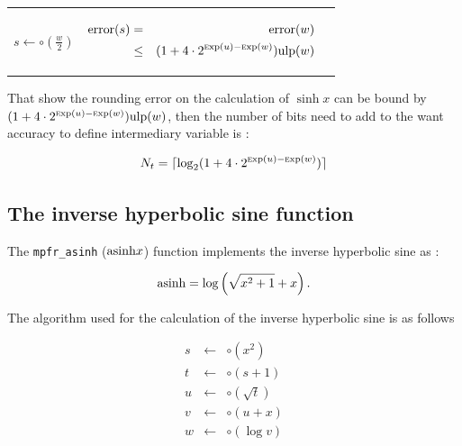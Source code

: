 \documentclass[12pt]{amsart}
\def\n{\textnormal}
\def\ulp{{\rm ulp}}
\def\Exp{{\rm \textsc exp}}
\begin{document}
\begin{center}
\begin{tabular}{l l l}
\begin{minipage}{2.5cm}
$s \leftarrow \circ(\frac{w}{2}) $
\end{minipage} &
\begin{minipage}{7.5cm}

\begin{center}


\begin{eqnarray}\nonumber
 {\textnormal{error}}(s) & = &  {\textnormal{error}}(w)\\\nonumber
 & \leq &  (1+ 4 \cdot 2^{\Exp(u)-\Exp(w)}) \ulp(w)
\end{eqnarray}



\end{center}

\end{minipage} &
\begin{minipage}{6cm}


\end{minipage}


\end{tabular}
\end{center}


That show the rounding error on the calculation of $\sinh x$ can be bound by $(1+ 4 \cdot 2^{\Exp(u)-\Exp(w)}) \ulp(w)$, then the number of bits need to add to the want accuracy to define intermediary variable is :

\[
N_t=\lceil \log_2(1+ 4 \cdot 2^{\Exp(u)-\Exp(w)}) \rceil
\]


\subsection{The inverse hyperbolic sine function}

The {\tt mpfr\_asinh} ($\n{asinh}{x}$) function implements the inverse hyperbolic sine as :

\[\n{asinh} = \log \left( \sqrt{x^2+1} + x \right).\]

The algorithm used for the calculation of the inverse hyperbolic sine is as follows

\begin{eqnarray}\nonumber
s&\leftarrow&\circ(x^2)\\\nonumber
t&\leftarrow&\circ(s+1)\\\nonumber
u&\leftarrow&\circ(\sqrt{t})\\\nonumber
v&\leftarrow&\circ(u+x)\\\nonumber
w&\leftarrow&\circ(\log  v)
\end{eqnarray}
\end{document}
